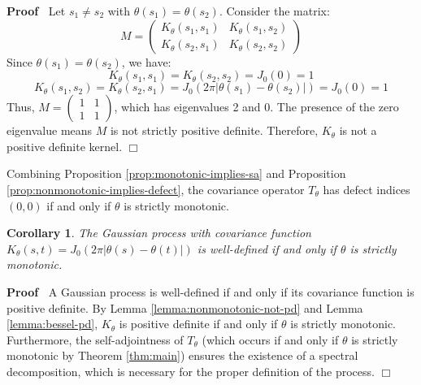 \documentclass{article}
\newenvironment{proof}{\noindent\textbf{Proof\ }}{\hspace*{\fill}$\Box$\medskip}
\newtheorem{corollary}{Corollary}
\begin{document}
\begin{proof}
  Let $s_1 \neq s_2$ with $\theta (s_1) = \theta (s_2)$. Consider the matrix:
  \begin{equation}
    M = \left(\begin{array}{cc}
      K_{\theta} (s_1, s_1) & K_{\theta} (s_1, s_2)\\
      K_{\theta} (s_2, s_1) & K_{\theta} (s_2, s_2)
    \end{array}\right)
  \end{equation}
  Since $\theta (s_1) = \theta (s_2)$, we have:
  \begin{equation}
    K_{\theta} (s_1, s_1) = K_{\theta} (s_2, s_2) = J_0 (0) = 1
  \end{equation}
  \begin{equation}
    K_{\theta} (s_1, s_2) = K_{\theta} (s_2, s_1) = J_0  (2 \pi | \theta (s_1)
    - \theta (s_2) |) = J_0 (0) = 1
  \end{equation}
  Thus, $M = \left(\begin{array}{cc}
    1 & 1\\
    1 & 1
  \end{array}\right)$, which has eigenvalues 2 and 0. The presence of the zero
  eigenvalue means $M$ is not strictly positive definite. Therefore,
  $K_{\theta}$ is not a positive definite kernel.
\end{proof}

Combining Proposition \ref{prop:monotonic-implies-sa} and Proposition
\ref{prop:nonmonotonic-implies-defect}, the covariance operator $T_{\theta}$
has defect indices $(0, 0)$ if and only if $\theta$ is strictly monotonic.

\begin{corollary}
  The Gaussian process with covariance function $K_{\theta} (s, t) = J_0  (2
  \pi | \theta (s) - \theta (t) |)$ is well-defined if and only if $\theta$ is
  strictly monotonic.
\end{corollary}

\begin{proof}
  A Gaussian process is well-defined if and only if its covariance function is
  positive definite. By Lemma \ref{lemma:nonmonotonic-not-pd} and Lemma
  \ref{lemma:bessel-pd}, $K_{\theta}$ is positive definite if and only if
  $\theta$ is strictly monotonic. Furthermore, the self-adjointness of
  $T_{\theta}$ (which occurs if and only if $\theta$ is strictly monotonic by
  Theorem \ref{thm:main}) ensures the existence of a spectral decomposition,
  which is necessary for the proper definition of the process.
\end{proof}

\
\end{document}
